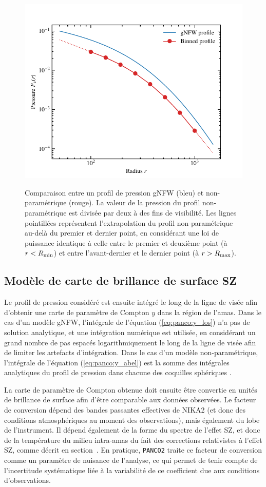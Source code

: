 \begin{figure}
    \caption{
        Comparaison entre un profil de pression gNFW (bleu) et non-paramétrique (rouge).
        La valeur de la pression du profil non-paramétrique est divisée par deux à des fins de visibilité.
        Les lignes pointillées représentent l'extrapolation du profil non-paramétrique au-delà du premier et dernier point, en considérant une loi de puissance identique à celle entre le premier et deuxième point (à $r < R_{\rm min}$) et entre l'avant-dernier et le dernier point (à $r > R_{\rm max}$).
    }
    \includegraphics[width=.65\linewidth]{Figures/Chap_panco/gnfw_np.pdf}
    \label{fig:panco:gnfw_np}
\end{figure}

\subsection{Modèle de carte de brillance de surface SZ}

Le profil de pression considéré est ensuite intégré le long de la ligne de visée afin d'obtenir une carte de paramètre de Compton $y$ dans la région de l'amas.
Dans le cas d'un modèle gNFW, l'intégrale de l'équation (\ref{eq:panco:y_los}) n'a pas de solution analytique, et une intégration numérique est utilisée, en considérant un grand nombre de pas espacés logarithmiquement le long de la ligne de visée afin de limiter les artefacts d'intégration.
Dans le cas d'un modèle non-paramétrique, l'intégrale de l'équation (\ref{eq:panco:y_abel}) est la somme des intégrales analytiques du profil de pression dans chacune des coquilles sphériques \cite{romero_multi-instrument_2018}.

La carte de paramètre de Compton obtenue doit ensuite être convertie en unités de brillance de surface afin d'être comparable aux données observées.
Le facteur de conversion dépend des bandes passantes effectives de NIKA2 (et donc des conditions atmosphériques au moment des observations), mais également du lobe de l'instrument.
Il dépend également de la forme du spectre de l'effet SZ, et donc de la température du milieu intra-amas du fait des corrections relativistes à l'effet SZ, comme décrit en section~.
En pratique, \texttt{PANCO2} traite ce facteur de conversion comme un paramètre de nuisance de l'analyse, ce qui permet de tenir compte de l'incertitude systématique liée à la variabilité de ce coefficient due aux conditions d'observations.

